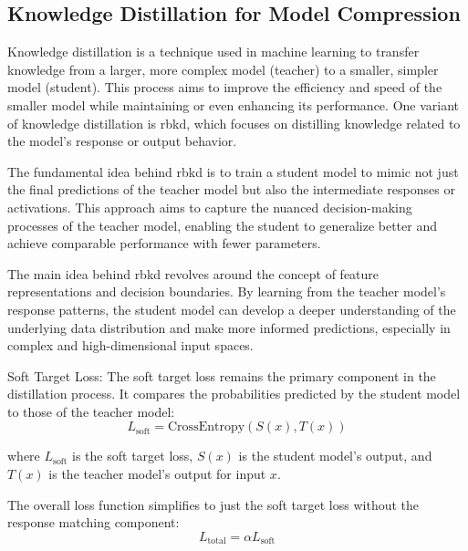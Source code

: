 \documentclass{ioereport}
\begin{document}
    \subsection{Knowledge Distillation for Model Compression}
    Knowledge distillation is a technique used in machine learning to transfer knowledge from a larger, more complex model (teacher) to a smaller, simpler model (student). This process aims to improve the efficiency and speed of the smaller model while maintaining or even enhancing its performance. One variant of knowledge distillation is \gls{rbkd}, which focuses on distilling knowledge related to the model's response or output behavior.

    The fundamental idea behind \gls{rbkd} is to train a student model to mimic not just the final predictions of the teacher model but also the intermediate responses or activations. This approach aims to capture the nuanced decision-making processes of the teacher model, enabling the student to generalize better and achieve comparable performance with fewer parameters.
    
    The main idea behind \gls{rbkd} revolves around the concept of feature representations and decision boundaries. By learning from the teacher model's response patterns, the student model can develop a deeper understanding of the underlying data distribution and make more informed predictions, especially in complex and high-dimensional input spaces.
    
    
    Soft Target Loss:
    The soft target loss remains the primary component in the distillation process. It compares the probabilities predicted by the student model to those of the teacher model:
    \begin{equation}
        L_{\text{soft}} = \text{CrossEntropy}(S(x), T(x))
    \end{equation}
    
    where $L_{\text{soft}}$ is the soft target loss, $S(x)$ is the student model's output, and $T(x)$ is the teacher model's output for input $x$.
    
    The overall loss function simplifies to just the soft target loss without the response matching component:
    \begin{equation}
        L_{\text{total}} = \alpha L_{\text{soft}}
    \end{equation}
\end{document}
